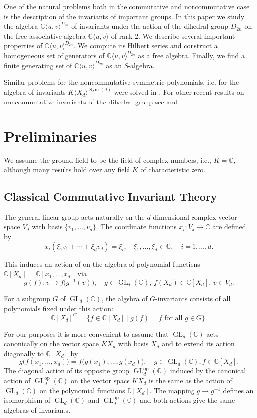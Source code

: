 \documentclass{amsart}[12pt]
\theoremstyle{definition}
\DeclareMathOperator{\Sym}{Sym}
\DeclareMathOperator{\GL}{GL}
\newcommand{\C}{{\mathbb{C}}}
\newcommand{\op}{\mathrm{op}}
\newcommand{\Cuv}{\C \langle u,v\rangle}
\newcommand{\CuvD}{{\mathbb C}\langle u,v\rangle^{D_{2n}}}
\newcommand{\Dn}{D_{2n}}
\begin{document}
One of the natural problems both in the commutative and noncommutative case is the description of the invariants of important groups.
In this paper we study the algebra $\CuvD$ of invariants under the action of the dihedral group $\Dn$ on the free associative algebra $\Cuv$ of rank $2$.
We describe several important properties of $\CuvD$. We compute its Hilbert series and construct a homogeneous set of generators of $\CuvD$ as a free algebra.
Finally, we find a finite generating set of $\CuvD$ as an $S$-algebra.

Similar problems for the noncommutative symmetric polynomials, i.e. for the algebra of invariants $K\langle X_d\rangle^{\Sym(d)}$ were solved in \cite{BDDK}.
For other recent results on noncommutative invariants of the dihedral group see \cite{D4} and \cite{D5}.

\section{\textbf{Preliminaries}}

We assume the ground field to be the field of complex numbers, i.e.,
$K = \C$, although many results hold over any field $K$ of characteristic zero.

\subsection{Classical Commutative Invariant Theory}

The general linear group acts naturally on the $d$-dimensional complex vector space $V_d$ with basis $\{v_1,\ldots,v_d\}$. The coordinate functions $x_i:V_d\to {\mathbb C}$ are defined by
\[
x_i(\xi_1v_1+\cdots+\xi_dv_d)=\xi_i,\quad \xi_1,\ldots,\xi_d\in \C, \quad i=1,\ldots,d.
\]

This induces an action of on the algebra of polynomial functions $\C[X_d]={\mathbb C}[x_1,\ldots,x_d]$ via
\[
g(f):v\to f\big(g^{-1}(v)\big),\quad g\in \GL_d(\C),\, f(X_d)\in \C[X_d],\, v\in V_d.
\]

For a subgroup $G$ of $\GL_d(\C)$, the algebra of $G$-invariants consists of all polynomials fixed under this action:
\[
\C[X_d]^G=\big\{f\in \C[X_d]\mid g(f)=f\text{ for all }g\in G\big\}.
\]

For our purposes it is more convenient to assume that $\GL_d(\C)$ acts canonically on the vector space $KX_d$ with basis $X_d$ and to extend its action diagonally to $\C[X_d]$ by
\[
g\big(f(x_1,\ldots,x_d)\big)=f\big(g(x_1),\ldots,g(x_d)\big),\quad g\in \GL_d(\C), f\in \C[X_d].
\]
The diagonal action of its opposite group $\GL_d^\op(\C)$ induced by the canonical action of $\GL_d^\op(\C)$ on the vector space $KX_d$
is the same as the action of $\GL_d(\C)$ on the polynomial functions $\C[X_d]$.
The mapping $g\to g^{-1}$ defines an isomorphism of $\GL_d(\C)$ and $\GL_d^\op(\C)$ and both actions give the same algebras of invariants.
\end{document}
